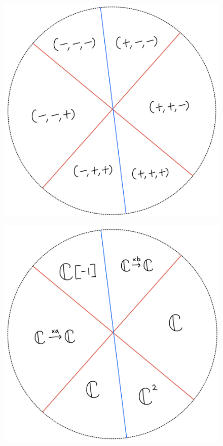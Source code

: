 \begin{figure}[H]
    \centering
    \includegraphics[scale = 0.95]{diagrams/lemma4/24.png}
    \caption{}
    \label{fig:your-label}
\end{figure}
\begin{figure}[H]
    \centering
    \includegraphics[scale = 0.95]{diagrams/lemma4/25.png}
    \caption{}
    \label{fig:your-label}
\end{figure}
